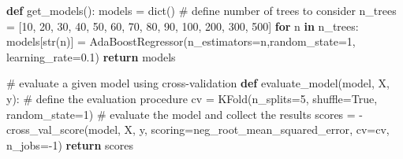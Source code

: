 \documentclass[
  letterpaper,
  DIV=11,
  numbers=noendperiod]{scrreprt}
\newenvironment{Shaded}{\begin{snugshade}}{\end{snugshade}}
\newcommand{\BuiltInTok}[1]{\textcolor[rgb]{0.00,0.23,0.31}{#1}}
\newcommand{\CommentTok}[1]{\textcolor[rgb]{0.37,0.37,0.37}{#1}}
\newcommand{\ControlFlowTok}[1]{\textcolor[rgb]{0.00,0.23,0.31}{\textbf{#1}}}
\newcommand{\DecValTok}[1]{\textcolor[rgb]{0.68,0.00,0.00}{#1}}
\newcommand{\FloatTok}[1]{\textcolor[rgb]{0.68,0.00,0.00}{#1}}
\newcommand{\KeywordTok}[1]{\textcolor[rgb]{0.00,0.23,0.31}{\textbf{#1}}}
\newcommand{\NormalTok}[1]{\textcolor[rgb]{0.00,0.23,0.31}{#1}}
\newcommand{\OperatorTok}[1]{\textcolor[rgb]{0.37,0.37,0.37}{#1}}
\newcommand{\StringTok}[1]{\textcolor[rgb]{0.13,0.47,0.30}{#1}}
\newcommand{\VariableTok}[1]{\textcolor[rgb]{0.07,0.07,0.07}{#1}}
\begin{document}
\begin{Shaded}
\begin{Highlighting}[]
\KeywordTok{def}\NormalTok{ get\_models():}
\NormalTok{    models }\OperatorTok{=} \BuiltInTok{dict}\NormalTok{()}
    \CommentTok{\# define number of trees to consider}
\NormalTok{    n\_trees }\OperatorTok{=}\NormalTok{ [}\DecValTok{10}\NormalTok{, }\DecValTok{20}\NormalTok{, }\DecValTok{30}\NormalTok{, }\DecValTok{40}\NormalTok{,  }\DecValTok{50}\NormalTok{, }\DecValTok{60}\NormalTok{, }\DecValTok{70}\NormalTok{,  }\DecValTok{80}\NormalTok{, }\DecValTok{90}\NormalTok{, }\DecValTok{100}\NormalTok{,  }\DecValTok{200}\NormalTok{, }\DecValTok{300}\NormalTok{, }\DecValTok{500}\NormalTok{]}
    \ControlFlowTok{for}\NormalTok{ n }\KeywordTok{in}\NormalTok{ n\_trees:}
\NormalTok{        models[}\BuiltInTok{str}\NormalTok{(n)] }\OperatorTok{=}\NormalTok{ AdaBoostRegressor(n\_estimators}\OperatorTok{=}\NormalTok{n,random\_state}\OperatorTok{=}\DecValTok{1}\NormalTok{, learning\_rate}\OperatorTok{=}\FloatTok{0.1}\NormalTok{)}
    \ControlFlowTok{return}\NormalTok{ models}

\CommentTok{\# evaluate a given model using cross{-}validation}
\KeywordTok{def}\NormalTok{ evaluate\_model(model, X, y):}
    \CommentTok{\# define the evaluation procedure}
\NormalTok{    cv }\OperatorTok{=}\NormalTok{ KFold(n\_splits}\OperatorTok{=}\DecValTok{5}\NormalTok{, shuffle}\OperatorTok{=}\VariableTok{True}\NormalTok{, random\_state}\OperatorTok{=}\DecValTok{1}\NormalTok{)}
    \CommentTok{\# evaluate the model and collect the results}
\NormalTok{    scores }\OperatorTok{=} \OperatorTok{{-}}\NormalTok{cross\_val\_score(model, X, y, scoring}\OperatorTok{=}\StringTok{\textquotesingle{}neg\_root\_mean\_squared\_error\textquotesingle{}}\NormalTok{, cv}\OperatorTok{=}\NormalTok{cv, n\_jobs}\OperatorTok{={-}}\DecValTok{1}\NormalTok{)}
    \ControlFlowTok{return}\NormalTok{ scores}


\end{Highlighting}
\end{Shaded}
\end{document}
